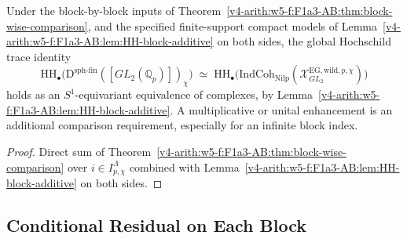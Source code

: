 \begin{corollary}[F1.a.3.A assembly]
\label{v4-arith:w5-f:F1a3-AB:cor:F1a3-A-assembly}
\ClaimStatusProvedHereConditional Under the block-by-block inputs
of Theorem~\ref{v4-arith:w5-f:F1a3-AB:thm:block-wise-comparison}, and the
specified finite-support compact models of
Lemma~\ref{v4-arith:w5-f:F1a3-AB:lem:HH-block-additive} on both sides,
the global Hochschild trace identity
\begin{equation}
\mathrm{HH}_{\bullet}\bigl(\mathrm{D}^{\mathrm{sph\text{-}fin}}([GL_{2}(\mathbb{Q}_{p})])_{\chi}\bigr)
\;\simeq\;
\mathrm{HH}_{\bullet}\bigl(\mathrm{IndCoh}_{\mathrm{Nilp}}(\mathcal{X}^{\mathrm{EG,wild},p,\chi}_{GL_{2}})\bigr)
\end{equation}
holds as an \(S^1\)-equivariant equivalence of complexes, by
Lemma~\ref{v4-arith:w5-f:F1a3-AB:lem:HH-block-additive}.
A multiplicative or unital enhancement is an additional comparison
requirement, especially for an infinite block index.
\end{corollary}

\begin{proof}
Direct sum of
Theorem~\ref{v4-arith:w5-f:F1a3-AB:thm:block-wise-comparison} over
\(i\in I_{p,\chi}^{\Lambda}\) combined with
Lemma~\ref{v4-arith:w5-f:F1a3-AB:lem:HH-block-additive} on both sides.
\end{proof}

\subsection{Conditional Residual on Each Block}

